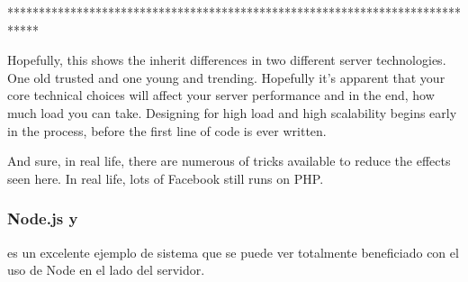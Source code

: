 %
%


*****************************************************************************


Hopefully, this shows the inherit differences in two different server technologies. One old trusted and one young and trending. Hopefully it’s apparent that your core technical choices will affect your server performance and in the end, how much load you can take. Designing for high load and high scalability begins early in the process, before the first line of code is ever written.

And sure, in real life, there are numerous of tricks available to reduce the effects seen here. In real life, lots of Facebook still runs on PHP.


\subsubsection{Node.js y }

 es un excelente ejemplo de sistema que se puede ver totalmente beneficiado con el uso de Node en el lado del servidor. 

